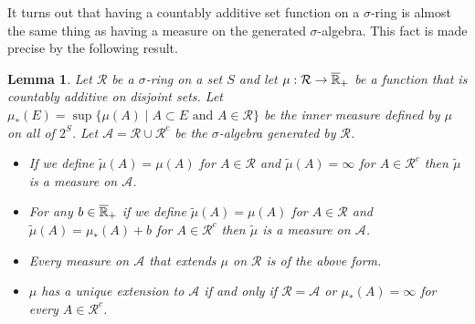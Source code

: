 \documentclass{amsart}
\newtheorem{lem}[thm]{Lemma}
\theoremstyle{remark}
\theoremstyle{definition}
\begin{document}
It turns out that having a countably additive set function on a
$\sigma$-ring is almost the same thing as having a measure on the
generated $\sigma$-algebra.  This fact is made precise by the
following result.
\begin{lem}\label{ExtendingMeasuresFromSigmaRing}Let $\mathcal{R}$ be a $\sigma$-ring on a set $S$ and let
  $\mu : \mathcal{R} \to \overline{\mathbb{R}}_+$ be a function that is
  countably additive on disjoint sets.  Let $\mu_*(E) = \sup \lbrace
  \mu(A) \mid A
  \subset E \text{ and } A \in \mathcal{R} \rbrace$ be the inner measure
  defined by $\mu$ on all of $2^S$.  Let $\mathcal{A} = \mathcal{R}
  \cup \mathcal{R}^c$ be the $\sigma$-algebra generated by
  $\mathcal{R}$.
\begin{itemize}
\item[(i)]If we define $\tilde{\mu}(A) = \mu(A)$ for $A \in
  \mathcal{R}$ and $\tilde{\mu}(A) = \infty$ for $A \in \mathcal{R}^c$
  then $\tilde{\mu}$ is a measure on $\mathcal{A}$.
\item[(ii)]For any $b \in \overline{\mathbb{R}}_+$ if we define
  $\tilde{\mu}(A) = \mu(A)$ for $A \in
  \mathcal{R}$ and $\tilde{\mu}(A) = \mu_*(A) + b$ for $A \in \mathcal{R}^c$
  then $\tilde{\mu}$ is a measure on $\mathcal{A}$.
\item[(iii)]Every measure on $\mathcal{A}$ that extends $\mu$ on
  $\mathcal{R}$ is of the above form.
\item[(iv)]$\mu$ has a unique extension to $\mathcal{A}$ if and only
  if $\mathcal{R} = \mathcal{A}$ or $\mu_*(A) = \infty$ for every $A \in \mathcal{R}^c$.
\end{itemize}
\end{lem}
\end{document}
